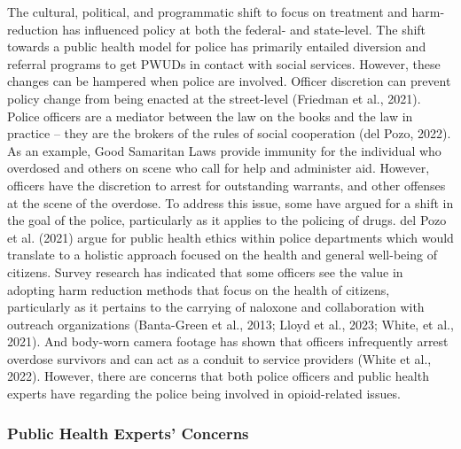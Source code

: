 The cultural, political, and programmatic shift to focus on treatment and harm-reduction has influenced policy at both the federal- and state-level. The shift towards a public health model for police has primarily entailed diversion and referral programs to get PWUDs in contact with social services. However, these changes can be hampered when police are involved. Officer discretion can prevent policy change from being enacted at the street-level (Friedman et al., 2021). Police officers are a mediator between the law on the books and the law in practice – they are the brokers of the rules of social cooperation (del Pozo, 2022). As an example, Good Samaritan Laws provide immunity for the individual who overdosed and others on scene who call for help and administer aid. However, officers have the discretion to arrest for outstanding warrants, and other offenses at the scene of the overdose. To address this issue, some have argued for a shift in the goal of the police, particularly as it applies to the policing of drugs. del Pozo et al. (2021) argue for public health ethics within police departments which would translate to a holistic approach focused on the health and general well-being of citizens. Survey research has indicated that some officers see the value in adopting harm reduction methods that focus on the health of citizens, particularly as it pertains to the carrying of naloxone and collaboration with outreach organizations (Banta-Green et al., 2013; Lloyd et al., 2023; White, et al., 2021). And body-worn camera footage has shown that officers infrequently arrest overdose survivors and can act as a conduit to service providers (White et al., 2022). However, there are concerns that both police officers and public health experts have regarding the police being involved in opioid-related issues.

\subsubsection{Public Health Experts’ Concerns} %

